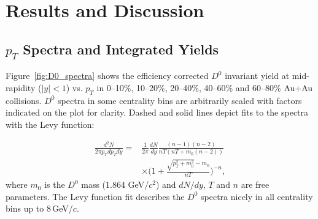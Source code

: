 \documentclass[%
 reprint,	
 amsmath,amssymb,
 aps,
 prc,
]{revtex4-1}
\begin{document}


\section{Results and Discussion}
\label{result}

\subsection{$p_{T}$ Spectra and Integrated Yields}
\label{result:pt}

Figure~\ref{fig:D0_spectra} shows the efficiency corrected $D^0$ invariant yield at mid-rapidity ($|y|<1$) vs. $p_{T}$ in 0--10\%, 10--20\%, 20--40\%, 40--60\% and 60--80\% Au+Au collisions. $D^0$ spectra in some centrality bins are arbitrarily scaled with factors indicated on the plot for clarity. Dashed and solid lines depict fits to the spectra with the Levy function:

\begin{equation}
  \begin{aligned}
    \frac{d^2N}{2\pi p_{T}dp_{T}dy} = 
   & \frac{1}{2\pi}\frac{dN}{dy}\frac{(n-1)(n-2)}{nT(nT+m_0(n-2))} \\
  & \times \bigg(1+\frac{\sqrt{p_{T}^2+m_0^2}-m_0}{nT}\bigg)^{-n},
  \end{aligned}
\label{equ:equation4}
\end{equation}
where $m_0$ is the $D^0$ mass (1.864 GeV/$c^2$) and $dN/dy$, $T$ and $n$ are free parameters. The Levy function fit describes the $D^0$ spectra nicely in all centrality bins up to 8\,GeV/$c$.
\end{document}
